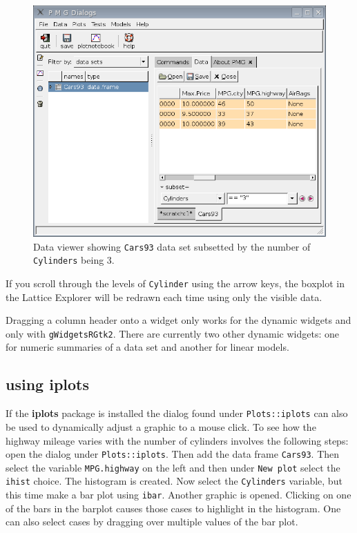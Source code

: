 \documentclass[12pt]{article}
\newcommand{\RCode}[1]{\texttt{#1}}
\newcommand{\RPackage}[1]{\textbf{#1}}
\begin{document}
\begin{figure}[htbp]
  \centering
  \includegraphics{data-viewer-with-subset}
  \caption{Data viewer showing \RCode{Cars93} data set subsetted by the number of \RCode{Cylinders} being 3.}
  \label{fig:data-viewer-with-subset}
\end{figure}

If you scroll through the levels of \RCode{Cylinder} using the arrow
keys, the boxplot in the Lattice Explorer will be  redrawn each time
using only the visible data.


Dragging a column header onto a widget only works for the dynamic
widgets and only with \RCode{gWidgetsRGtk2}. There are currently two
other dynamic widgets: one for numeric summaries of a data set and
another for linear models.

\subsection{using \RPackage{iplots}}

If the \RPackage{iplots} package is installed the dialog found under
\RCode{Plots::iplots} can also be used to dynamically adjust a graphic
to a mouse click. To see how the highway mileage varies with the
number of cylinders involves the following steps: open the dialog
under \RCode{Plots::iplots}. Then add the data frame
\RCode{Cars93}. Then select the variable \RCode{MPG.highway} on the
left and then under \RCode{New plot} select the \RCode{ihist}
choice. The histogram is created. Now select the \RCode{Cylinders}
variable, but this time make a bar plot using \RCode{ibar}. Another
graphic is opened. Clicking on one of the bars in the barplot causes
those cases to highlight in the histogram. One can also select cases
by dragging over multiple values of the bar plot.
\end{document}
